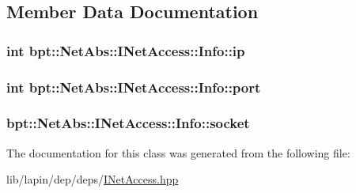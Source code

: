 \subsection{Member Data Documentation}
\hypertarget{classbpt_1_1_net_abs_1_1_i_net_access_1_1_info_a80f38b113662022cefe16eec15d0a3f5}{
\subsubsection[{ip}]{ {\bf int} bpt\-::\-Net\-Abs\-::\-I\-Net\-Access\-::\-Info\-::ip}}\label{classbpt_1_1_net_abs_1_1_i_net_access_1_1_info_a80f38b113662022cefe16eec15d0a3f5}
\hypertarget{classbpt_1_1_net_abs_1_1_i_net_access_1_1_info_a46d84541ee22bb069c42ea79a5f0b601}{
\subsubsection[{port}]{ {\bf int} bpt\-::\-Net\-Abs\-::\-I\-Net\-Access\-::\-Info\-::port}}\label{classbpt_1_1_net_abs_1_1_i_net_access_1_1_info_a46d84541ee22bb069c42ea79a5f0b601}
\hypertarget{classbpt_1_1_net_abs_1_1_i_net_access_1_1_info_a74e72bcc0638bc083800a39fa107073d}{
\subsubsection[{socket}]{ bpt\-::\-Net\-Abs\-::\-I\-Net\-Access\-::\-Info\-::socket}}\label{classbpt_1_1_net_abs_1_1_i_net_access_1_1_info_a74e72bcc0638bc083800a39fa107073d}


The documentation for this class was generated from the following file\-:\begin{DoxyCompactItemize}
\item 
lib/lapin/dep/deps/\hyperlink{_i_net_access_8hpp}{I\-Net\-Access.\-hpp}\end{DoxyCompactItemize}
